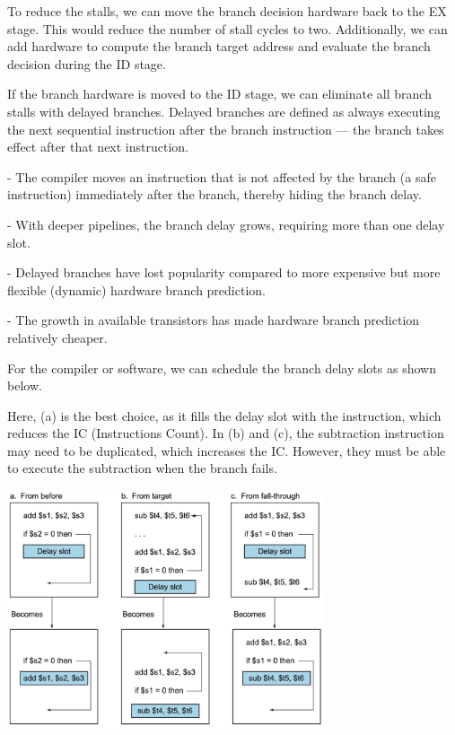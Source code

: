 To reduce the stalls, we can move the branch decision hardware back to the EX stage. This would reduce the number of stall cycles to two. Additionally, we can add hardware to compute the branch target address and evaluate the branch decision during the ID stage.

If the branch hardware is moved to the ID stage, we can eliminate all branch stalls with delayed branches. Delayed branches are defined as always executing the next sequential instruction after the branch instruction — the branch takes effect after that next instruction.

- The compiler moves an instruction that is not affected by the branch (a safe instruction) immediately after the branch, thereby hiding the branch delay.

- With deeper pipelines, the branch delay grows, requiring more than one delay slot.


- Delayed branches have lost popularity compared to more expensive but more flexible (dynamic) hardware branch prediction.

- The growth in available transistors has made hardware branch prediction relatively cheaper.

For the compiler or software, we can schedule the branch delay slots as shown below. 

Here, (a) is the best choice, as it fills the delay slot with the instruction, which reduces the IC (Instructions Count). In (b) and (c), the subtraction instruction may need to be duplicated, which increases the IC. However, they must be able to execute the subtraction when the branch fails.

\begin{center}
  \includegraphics[width=0.7\textwidth]{Figure/branch_delay_schedule.png}
\end{center}

